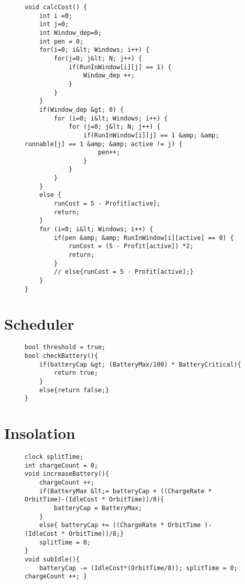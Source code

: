 \begin{figure}[H]
\begin{lstlisting}[language=my_c, caption={Declarations for Processor template}, label=lst:core_processor_code2, firstnumber=94]
void calcCost() {
	int i =0;
	int j=0;
	int Window_dep=0;
	int pen = 0;
	for(i=0; i&lt; Windows; i++) {
		for(j=0; j&lt; N; j++) {
			if(RunInWindow[i][j] == 1) {
				Window_dep ++;
			}
		}
	}
	if(Window_dep &gt; 0) {
		for (i=0; i&lt; Windows; i++) {
			for (j=0; j&lt; N; j++) {
				if(RunInWindow[i][j] == 1 &amp; &amp; runnable[j] == 1 &amp; &amp; active != j) {
					pen++;
				}
			}
		}
	}
	else {
		runCost = 5 - Profit[active];
		return;
	}
	for (i=0; i&lt; Windows; i++) {
		if(pen &amp; &amp; RunInWindow[i][active] == 0) {
			runCost = (5 - Profit[active]) *2;
			return;
		}
		// else{runCost = 5 - Profit[active];}
	}
}
\end{lstlisting}
\end{figure}
\section{Scheduler}
\begin{figure}[H]
\begin{lstlisting}[language=my_c, caption={Declarations for Scheduler template}, label=lst:core_scheduler_code]
bool threshold = true; 
bool checkBattery(){ 
	if(batteryCap &gt; (BatteryMax/100) * BatteryCritical){ 
		return true;
	} 
	else{return false;}
}
\end{lstlisting}
\end{figure}

\section{Insolation}
\begin{figure}[H]
\begin{lstlisting}[language=my_c, caption={Declarations for Insolation template}, label=lst:core_insolation_code]
clock splitTime; 
int chargeCount = 0; 
void increaseBattery(){
	chargeCount ++;
	if(BatteryMax &lt;= batteryCap + ((ChargeRate * OrbitTime)-(IdleCost * OrbitTime))/8){
		batteryCap = BatteryMax;
	}
	else{ batteryCap += ((ChargeRate * OrbitTime )-(IdleCost * OrbitTime))/8;}
	splitTime = 0;
} 
void subIdle(){ 
	batteryCap -= (IdleCost*(OrbitTime/8)); splitTime = 0; chargeCount ++; }
\end{lstlisting}
\end{figure}


